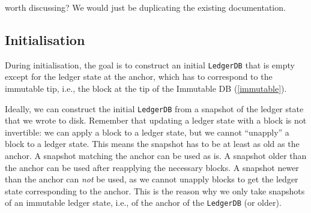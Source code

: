  worth discussing? We would just be duplicating the existing
documentation.

\subsection{Initialisation}
\label{ledgerdb:on-disk:initialisation}

During initialisation, the goal is to construct an initial \lstinline!LedgerDB!
that is empty except for the ledger state at the anchor, which has to correspond
to the immutable tip, i.e., the block at the tip of the Immutable DB
(\cref{immutable}).

Ideally, we can construct the initial \lstinline!LedgerDB! from a snapshot of
the ledger state that we wrote to disk. Remember that updating a ledger state
with a block is not invertible: we can apply a block to a ledger state, but we
cannot ``unapply'' a block to a ledger state. This means the snapshot has to be
at least as old as the anchor. A snapshot matching the anchor can be used as is.
A snapshot older than the anchor can be used after reapplying the necessary
blocks. A snapshot newer than the anchor can \emph{not} be used, as we cannot
unapply blocks to get the ledger state corresponding to the anchor. This is the
reason why we only take snapshots of an immutable ledger state, i.e., of the
anchor of the \lstinline!LedgerDB! (or older).

